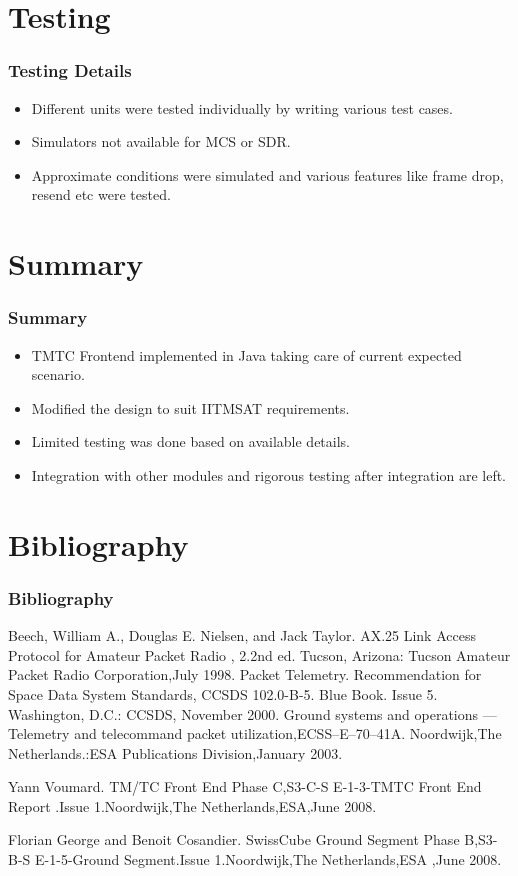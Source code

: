 \documentclass{beamer}
\begin{document}
\section{Testing}
\begin{frame}
\frametitle{Testing Details}
\begin{itemize}
\item Different units were tested individually by writing various test cases.
\item Simulators not available for MCS or SDR.
\item Approximate conditions were simulated and various features like frame drop, resend etc were tested.
\end{itemize}
\end{frame}

\section{Summary}
\begin{frame}
\frametitle{Summary}
\begin{itemize}
\item TMTC Frontend implemented in Java taking care of current expected scenario.
\item Modified the design to suit IITMSAT requirements.
\item Limited testing was done based on available details.
\item Integration with other modules and rigorous testing after integration are left.
\end{itemize}
\end{frame}

\section{Bibliography}
\begin{frame}
\frametitle{Bibliography}
\begin{thebibliography}{50}
 Beech, William A., Douglas E. Nielsen, and Jack Taylor. AX.25 Link Access Protocol for Amateur Packet Radio , 2.2nd ed. Tucson, Arizona: Tucson Amateur Packet Radio Corporation,July 1998.
Packet Telemetry. Recommendation for Space Data System Standards, CCSDS
102.0-B-5. Blue Book. Issue 5. Washington, D.C.: CCSDS, November 2000.
Ground systems and operations — Telemetry and telecommand packet utilization,ECSS--E--70--41A.
Noordwijk,The Netherlands.:ESA Publications Division,January 2003.

Yann Voumard. TM/TC Front End Phase C,S3-C-S E-1-3-TMTC Front End Report
.Issue 1.Noordwijk,The Netherlands,ESA,June 2008.


Florian George and Benoit Cosandier. SwissCube Ground Segment Phase B,S3-B-S E-1-5-Ground Segment.Issue 1.Noordwijk,The Netherlands,ESA ,June 2008.


\end{thebibliography}
\end{frame}
\end{document}
